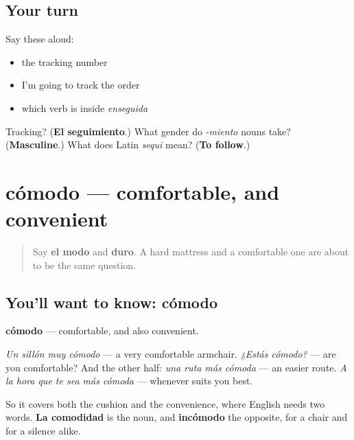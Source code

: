 \subsection*{Your turn}
Say these aloud:

\begin{itemize}
\raggedright
  \item the tracking number
  \item I'm going to track the order
  \item which verb is inside \emph{enseguida}
\end{itemize}

\begin{tcolorbox}[breakable,colback=teal!4,colframe=teal!35!black,title={Before you move on}]
Tracking? (\textbf{El seguimiento}.) What gender do \emph{-miento} nouns take? (\textbf{Masculine}.) What does Latin \emph{sequi} mean? (\textbf{To follow}.)
\end{tcolorbox}
\section[cómodo]{cómodo — comfortable, and convenient}

\label{lesson:ES-C452-comodo}



\begin{quote}
Say \textbf{el modo} and \textbf{duro}. A hard mattress and a comfortable one are about to be the same question.
\end{quote}

\subsection*{You'll want to know: cómodo}
\textbf{cómodo} — comfortable, and also convenient.

\emph{Un sillón muy cómodo} — a very comfortable armchair. \emph{¿Estás cómodo?} — are you comfortable? And the other half: \emph{una ruta más cómoda} — an easier route. \emph{A la hora que te sea más cómoda} — whenever suits you best.

So it covers both the cushion and the convenience, where English needs two words. \textbf{La comodidad} is the noun, and \textbf{incómodo} the opposite, for a chair and for a silence alike.


